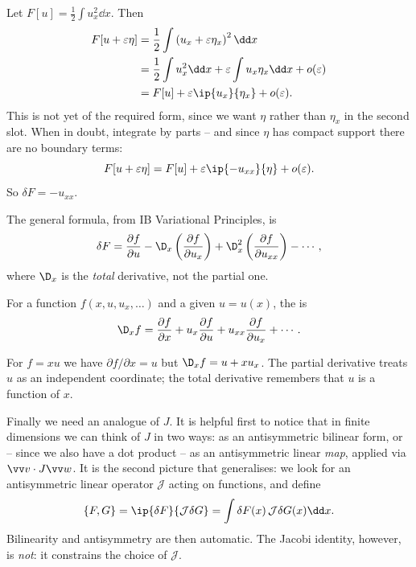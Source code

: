 \begin{example}
	Let $F[u] = \frac{1}{2}\int u_x^2\dd x$. Then
	\begin{align*}
		F[u+\varepsilon\eta] &= \frac{1}{2}\int\left(u_x + \varepsilon\eta_x\right)^2\dd x\\
		&= \frac{1}{2}\int u_x^2\dd x + \varepsilon\int u_x\eta_x\dd x + o(\varepsilon)\\
		&= F[u] + \varepsilon\ip{u_x}{\eta_x} + o(\varepsilon).
	\end{align*}
	This is not yet of the required form, since we want $\eta$ rather than $\eta_x$ in the second slot. When in doubt, integrate by parts -- and since $\eta$ has compact support there are no boundary terms:
	$$
	F[u+\varepsilon\eta] = F[u] + \varepsilon\ip{-u_{xx}}{\eta} + o(\varepsilon).
	$$
	So $\delta F = -u_{xx}$.
\end{example}

The general formula, from IB Variational Principles, is
$$
\delta F = \frac{\partial f}{\partial u} - \D_x\left(\frac{\partial f}{\partial u_x}\right) + \D_x^2\left(\frac{\partial f}{\partial u_{xx}}\right) - \cdots,
$$
where $\D_x$ is the \emph{total} derivative, not the partial one.

\begin{definition}
	For a function $f(x, u, u_x, \dots)$ and a given $u = u(x)$, the  is
	$$
	\D_xf = \frac{\partial f}{\partial x} + u_x\frac{\partial f}{\partial u} + u_{xx}\frac{\partial f}{\partial u_x} + \cdots.
	$$
\end{definition}

\begin{example}
	For $f = xu$ we have $\partial f/\partial x = u$ but $\D_xf = u + xu_x$. The partial derivative treats $u$ as an independent coordinate; the total derivative remembers that $u$ is a function of $x$.
\end{example}

Finally we need an analogue of $J$. It is helpful first to notice that in finite dimensions we can think of $J$ in two ways: as an antisymmetric bilinear form, or -- since we also have a dot product -- as an antisymmetric linear \emph{map}, applied via $\vv v\cdot J\vv w$. It is the second picture that generalises: we look for an antisymmetric linear operator $\mathcal J$ acting on functions, and define
$$
\{F, G\} = \ip{\delta F}{\mathcal J\delta G} = \int\delta F(x)\,\mathcal J\delta G(x)\dd x.
$$
Bilinearity and antisymmetry are then automatic. The Jacobi identity, however, is \emph{not}: it constrains the choice of $\mathcal J$.

